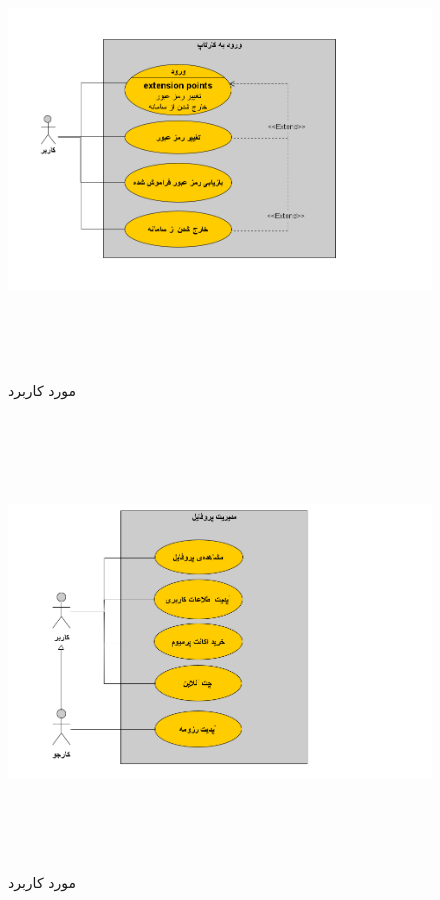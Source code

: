 \documentclass[12pt,svgnames,oneside]{book}
\begin{document}
\begin{figure}[H]
	\caption{مورد کاربرد }
	\begin{center}
		\includegraphics[width=\textwidth, height=12cm]{./images/3}
	\end{center}
\end{figure}

\begin{figure}[H]
	\caption{مورد کاربرد }
	\begin{center}
		\includegraphics[width=\textwidth, height=12cm]{./images/4}
	\end{center}
\end{figure}
\end{document}

